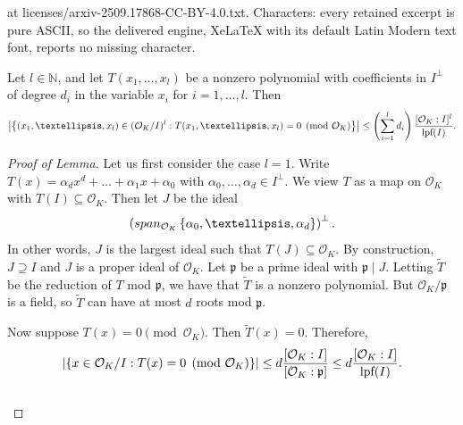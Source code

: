\documentclass[10pt,a4paper]{amsart}
\newcommand{\N}{\mathbb{N}}
\newcommand{\lpf}{\normalfont\text{lpf}}
\newcommand{\mO}{\mathcal{O}}
\newcommand{\p}{\mathfrak{p}}
\renewcommand{\tilde}{\widetilde}
\begin{document}
at licenses/arxiv-2509.17868-CC-BY-4.0.txt. Characters: every retained excerpt is pure ASCII, so the delivered engine, XeLaTeX with its default Latin Modern text font, reports no missing character.
	\begin{lemma} \label{lem: nonzero polynomial}
		Let $l \in \N$, and let $T(x_1, \dots, x_l)$ be a nonzero polynomial with coefficients in $I^{\perp}$ of degree $d_i$ in the variable $x_i$ for $i = 1, \dots, l$.
		Then
		\begin{equation*}
			\left| \left\{ (x_1, \dots, x_l) \in (\mO_K/I)^l : T(x_1, \dots, x_l) = 0 \pmod{\mO_K} \right\} \right| \le \left( \sum_{i=1}^l{d_i} \right) \frac{[\mO_K:I]^l}{\lpf(I)}.
		\end{equation*}
	\end{lemma}

	\begin{proof}[Proof of Lemma]
		Let us first consider the case $l = 1$.
        Write $T(x) = \alpha_d x^d + \ldots + \alpha_1 x + \alpha_0$ with $\alpha_0, \ldots, \alpha_d \in I^{\perp}$.
        We view $T$ as a map on $\mO_K$ with $T(I) \subseteq \mO_K$.
        Then let $J$ be the ideal
        \begin{equation*}
            \left( \textup{span}_{\mO_K}\left\{ \alpha_0, \ldots, \alpha_d \right\} \right)^{\perp}.
        \end{equation*}
        In other words, $J$ is the largest ideal such that $T(J) \subseteq \mO_K$.
        By construction, $J \supseteq I$ and $J$ is a proper ideal of $\mO_K$.
        Let $\p$ be a prime ideal with $\p \mid J$.
        Letting $\tilde{T}$ be the reduction of $T$ mod $\p$, we have that $\tilde{T}$ is a nonzero polynomial.
        But $\mO_K/\p$ is a field, so $\tilde{T}$ can have at most $d$ roots mod $\p$.
		
		Now suppose $T(x) = 0 \pmod{\mO_K}$.
		Then $\tilde{T}(x) = 0$.
		Therefore,
		\begin{equation*}
			\left| \{x \in \mO_K/I : T(x) = 0 \pmod{\mO_K} \} \right| \le d \frac{[\mO_K:I]}{[\mO_K:\p]} \le d \frac{[\mO_K:I]}{\lpf(I)}.
		\end{equation*} \\
		

\end{proof}
\end{document}
